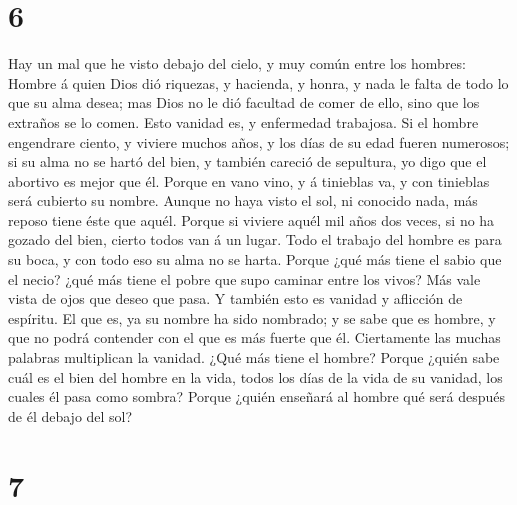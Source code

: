 \hypertarget{section-5}{%
\section{6}\label{section-5}}

 Hay un mal que he visto debajo del cielo, y muy común entre
los hombres:  Hombre á quien Dios dió riquezas, y hacienda,
y honra, y nada le falta de todo lo que su alma desea; mas Dios no le
dió facultad de comer de ello, sino que los extraños se lo comen. Esto
vanidad es, y enfermedad trabajosa.  Si el hombre engendrare
ciento, y viviere muchos años, y los días de su edad fueren numerosos;
si su alma no se hartó del bien, y también careció de sepultura, yo digo
que el abortivo es mejor que él.  Porque en vano vino, y á
tinieblas va, y con tinieblas será cubierto su nombre. 
Aunque no haya visto el sol, ni conocido nada, más reposo tiene éste que
aquél.  Porque si viviere aquél mil años dos veces, si no ha
gozado del bien, cierto todos van á un lugar.  Todo el
trabajo del hombre es para su boca, y con todo eso su alma no se harta.
 Porque ¿qué más tiene el sabio que el necio? ¿qué más tiene
el pobre que supo caminar entre los vivos?  Más vale vista
de ojos que deseo que pasa. Y también esto es vanidad y aflicción de
espíritu.  El que es, ya su nombre ha sido nombrado; y se
sabe que es hombre, y que no podrá contender con el que es más fuerte
que él.  Ciertamente las muchas palabras multiplican la
vanidad. ¿Qué más tiene el hombre?  Porque ¿quién sabe cuál
es el bien del hombre en la vida, todos los días de la vida de su
vanidad, los cuales él pasa como sombra? Porque ¿quién enseñará al
hombre qué será después de él debajo del sol?

\hypertarget{section-6}{%
\section{7}\label{section-6}}

